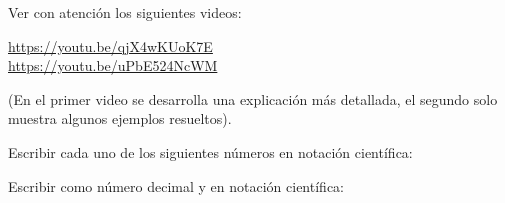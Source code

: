 \documentclass[12pt]{exam}
\begin{document}
\begin{questions}

    \question Ver con atención los siguientes videos:
     
         \url{https://youtu.be/qjX4wKUoK7E} \\
         \url{https://youtu.be/uPbE524NcWM}
    
    (En el primer video se desarrolla una explicación más detallada, el segundo solo muestra algunos ejemplos resueltos).

    \question Escribir cada uno de los siguientes números en notación científica:

    \question Escribir como número decimal y en notación científica:
\end{questions}
\end{document}
